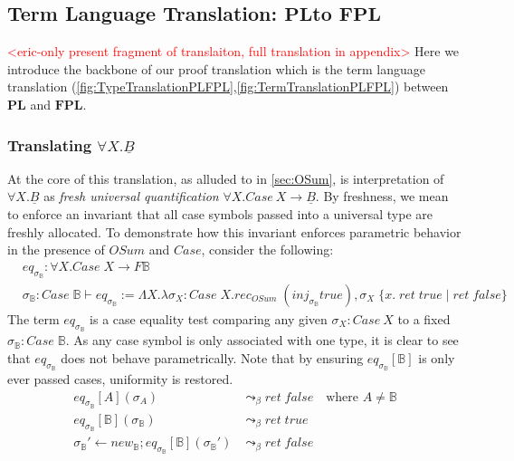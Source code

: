 \documentclass[acmsmall]{acmart}
\newcommand{\eric}[1]{\textcolor{red}{ <eric-#1> }}
\newcommand{\pl}{$\mathbf{PL}$}
\newcommand{\fpl}{$\mathbf{FPL}$}
\begin{document}
\subsection{Term Language Translation: \pl\;to \fpl}

\eric{only present fragment of translaiton, full translation in appendix}
Here we introduce the backbone of our proof translation which is the term language translation (\cref{fig:TypeTranslationPLFPL},\cref{fig:TermTranslationPLFPL}) between \pl\; and \fpl. 
\subsubsection{Translating $\forall X. \underline{B}$}\label{sec:TranslateForall}
At the core of this translation, as alluded to in \cref{sec:OSum}, is interpretation of $\forall X. \underline{B}$ as \textit{fresh universal quantification} $\forall X. Case\:X \to \underline{B}$. By freshness, we mean to enforce an invariant that all case symbols passed into a universal type are freshly allocated. To demonstrate how this invariant enforces parametric behavior in the presence of $OSum$ and $Case$, consider the following:
\begin{align*}
  &eq_{\sigma_{\mathbb{B}}} : \forall X. Case\;X \to F \mathbb{B}\\
  &\sigma_{\mathbb{B}}: Case\;\mathbb{B}\vdash eq_{\sigma_{\mathbb{B}}} := \Lambda X. \lambda \sigma_X: Case\;X .rec_{OSum}\; (inj_{\sigma_{\mathbb{B}}} true),\sigma_X \; \{x.\;ret\;true\;|\; ret\;false\} 
\end{align*}
The term $eq_{\sigma_{\mathbb{B}}}$ is a case equality test comparing any given $\sigma_X:Case\:X$ to a fixed $\sigma_{\mathbb{B}}:Case\;\mathbb{B}$. As any case symbol is only associated with one type, it is clear to see that $eq_{\sigma_{\mathbb{B}}}$ does not behave parametrically. Note that by ensuring $eq_{\sigma_{\mathbb{B}}}[\mathbb{B}]$ is only ever passed  cases, uniformity is restored.
\begin{align*}
  eq_{\sigma_{\mathbb{B}}}[A](\sigma_A) &\leadsto_{\beta} ret\;false \quad\text{where } A\neq \mathbb{B}\\
  eq_{\sigma_{\mathbb{B}}}[\mathbb{B}](\sigma_{\mathbb{B}}) &\leadsto_{\beta} ret\;true\\
  \sigma_{\mathbb{B}}' \leftarrow new_{\mathbb{B}};eq_{\sigma_{\mathbb{B}}}[\mathbb{B}](\sigma_{\mathbb{B}}') &\leadsto_{\beta} ret\;false\quad\\
\end{align*} 
\end{document}
